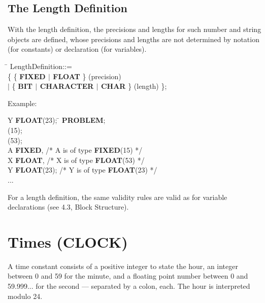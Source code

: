 \begin{tobedone}
\section{The Length Definition}   %

With the length definition, the precisions and lengths for such
number and string objects are defined, whose precisions and lengths are
not determined by notation (for constants) or declaration (for
variables).

\begin{front}
\begin{tabbing}
 \= \kill
LengthDefinition::=\\
 \{ \{ {\bf FIXED $\mid$ FLOAT} \} (precision)\\
              \x \> $\mid$ \{ {\bf BIT $\mid$ CHARACTER $\mid$ CHAR} \} (length) \};
\end{tabbing}
\end{front}
\begin{grammar}

\end{grammar}
Example:

\begin{tabbing}
\x \x Y {\bf FLOAT}(23); \x \= \kill
{\bf PROBLEM}; \> \\
(15); \> \\
(53); \> \\
 A {\bf FIXED}, \> /* A is of type {\bf FIXED}(15) */ \\
\x \x X {\bf FLOAT},        \> /* X is of type {\bf FLOAT}(53) */ \\
\x \x Y {\bf FLOAT}(23);    \> /* Y is of type {\bf FLOAT}(23) */ \\
\x ... \> \\
\end{tabbing}

For a length definition, the same validity rules are valid as for
variable declarations (see 4.3, Block Structure).
\end{tobedone}

\section{Times (CLOCK)}   %

A time constant consists of a positive integer to state the hour, an
integer between 0 and 59 for the minute, and a floating point number
between 0 and 59.999... for the second --- separated by a colon, each.
The hour is interpreted modulo 24.

